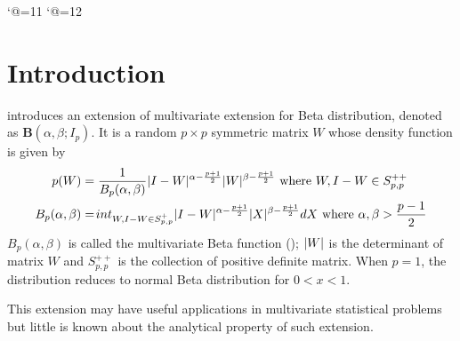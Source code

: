 \documentclass[twoside]{article}%
\DeclarePairedDelimiter\abs{\lvert}{\rvert}
\begin{document}
\newtheorem{theorem}{Theorem}[section]                                               %
\newtheorem{definition}{Definition}[section]                                         %
\newtheorem{lemma}{Lemma}[section]                                                   %
\newtheorem{proposition}{Proposition}[section]                                       %
\newtheorem{corollary}{Corollary}[section]                                           %
\newtheorem{remark}{Remark}[section]                                                 %
\renewcommand{\theequation}{\thesection.\arabic{equation}}                           %
\catcode`@=11                                                                        %
\setcounter{page}{1}                                                                 %
\thispagestyle{empty}                                                                %
\catcode`@=12                                                                        %

\section{Introduction}

\cite{david1981} introduces an extension of
multivariate extension for Beta distribution,
denoted as $\mathbf{B}(\alpha, \beta; I_p)$.
It is a random $p\times p$  symmetric matrix $W$ whose density
function is given by
\begin{align}
p(W) &= \frac{1}{B_p(\alpha, \beta)}\abs{I-W}^{\alpha-\frac{p+1}{2}}
\abs{W}^{\beta-\frac{p+1}{2}} \textrm{ where } W, I-W \in S_{p,p}^{++}
\label{eq:distr}\\
B_p(\alpha, \beta) &= \int_{W,I-W \in S_{p,p}^{+} }\abs{I-W}^{\alpha-\frac{p+1}{2}}
\abs{X}^{\beta-\frac{p+1}{2}}dX \textrm{ where } \alpha, \beta > \frac{p-1}{2}
\end{align}
$B_p(\alpha, \beta)$ is called the multivariate Beta function (\cite{siegel_1935}); 
$\abs{W}$ is the determinant of matrix $W$ and $S_{p,p}^{++}$ is the 
collection of positive
definite matrix.
When $p=1$, the distribution reduces to normal Beta distribution for
$0<x<1$.

This extension may have useful applications in multivariate statistical
problems but little is known about the analytical property of such extension.
\end{document}
